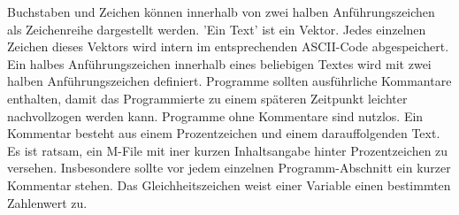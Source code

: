 {Buchstaben und Zeichen können innerhalb von zwei halben Anführungszeichen  als Zeichenreihe dargestellt werden. 'Ein Text' ist ein Vektor. Jedes einzelnen Zeichen dieses Vektors wird intern im entsprechenden ASCII-Code abgespeichert. Ein halbes Anführungszeichen innerhalb eines beliebigen Textes wird mit zwei halben Anführungszeichen definiert.
\newline\newline
Programme sollten ausführliche Kommantare \boxed{\textbf{\texttt{\%}}} enthalten, damit das Programmierte zu einem späteren Zeitpunkt leichter nachvollzogen werden kann. Programme ohne Kommentare sind nutzlos. Ein Kommentar besteht aus einem Prozentzeichen und einem darauffolgenden Text. Es ist ratsam, ein M-File mit iner kurzen Inhaltsangabe hinter Prozentzeichen zu versehen. Insbesondere sollte vor jedem einzelnen Programm-Abschnitt ein kurzer Kommentar stehen.
\newline\newline
Das Gleichheitszeichen \boxed{\textbf{\texttt{=}}} weist einer Variable einen bestimmten Zahlenwert zu.
}
